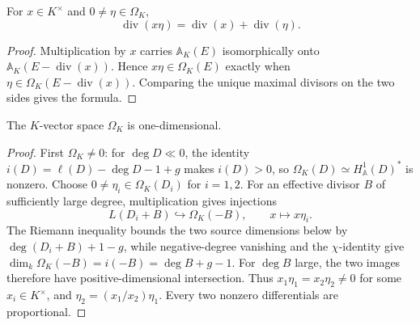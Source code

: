 \begin{theorem}
  \label{thm:adelic_weil_differential_divisor_mul}
  \notready
  For \(x\in K^\times\) and \(0\ne\eta\in\Omega_K\),
  \[
    \operatorname{div}(x\eta)
      =\operatorname{div}(x)+\operatorname{div}(\eta).
  \]
\end{theorem}
\begin{proof}
  Multiplication by \(x\) carries \(\mathbb A_K(E)\) isomorphically onto
  \(\mathbb A_K(E-\operatorname{div}(x))\).  Hence
  \(x\eta\in\Omega_K(E)\) exactly when
  \(\eta\in\Omega_K(E-\operatorname{div}(x))\).  Comparing the unique
  maximal divisors on the two sides gives the formula.
\end{proof}

\begin{theorem}
  \label{thm:adelic_weil_differentials_finrank_one}
  \notready
  The \(K\)-vector space \(\Omega_K\) is one-dimensional.
\end{theorem}
\begin{proof}
  First \(\Omega_K\ne0\): for \(\deg D\ll0\), the identity
  \(i(D)=\ell(D)-\deg D-1+g\) makes \(i(D)>0\), so
  \(\Omega_K(D)\simeq H^1_{\mathbb A}(D)^*\) is nonzero.  Choose
  \(0\ne\eta_i\in\Omega_K(D_i)\) for \(i=1,2\).  For an effective
  divisor \(B\) of sufficiently large degree, multiplication gives
  injections
  \[
    L(D_i+B)\hookrightarrow\Omega_K(-B),\qquad x\longmapsto x\eta_i.
  \]
  The Riemann inequality bounds the two source dimensions below by
  \(\deg(D_i+B)+1-g\), while negative-degree vanishing and the
  \(\chi\)-identity give
  \(\dim_k\Omega_K(-B)=i(-B)=\deg B+g-1\).  For \(\deg B\) large, the
  two images therefore have positive-dimensional intersection.  Thus
  \(x_1\eta_1=x_2\eta_2\ne0\) for some \(x_i\in K^\times\), and
  \(\eta_2=(x_1/x_2)\eta_1\).  Every two nonzero differentials are
  proportional.
\end{proof}

